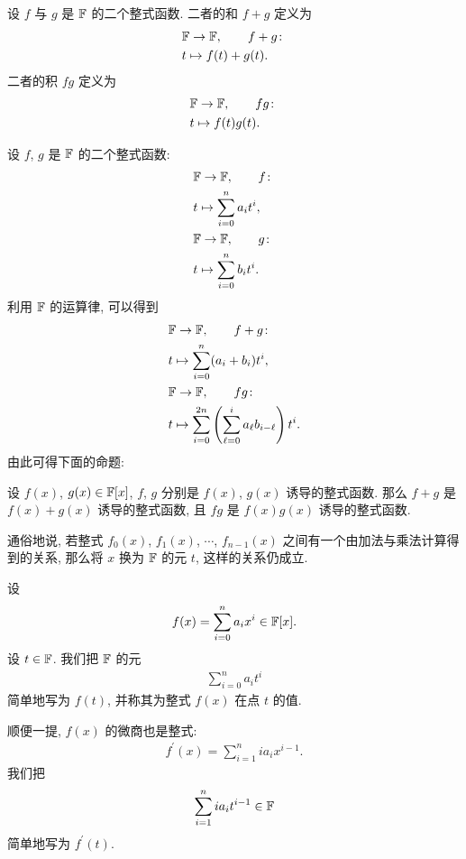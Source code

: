 \begin{definition}
    设 $f$ 与 $g$ 是 $\mathbb{F}$ 的二个整式函数. 二者的和 $f+g$ 定义为
    \begin{align*}
         & \mathbb{F} \to \mathbb{F}, \tag*{$f+g \colon$} \\
         & t \mapsto f(t) + g(t).
    \end{align*}
    二者的积 $fg$ 定义为
    \begin{align*}
         & \mathbb{F} \to \mathbb{F}, \tag*{$fg \colon$} \\
         & t \mapsto f(t) g(t).
    \end{align*}
\end{definition}

设 $f$, $g$ 是 $\mathbb{F}$ 的二个整式函数:
\begin{align*}
     & \mathbb{F} \to \mathbb{F}, \tag*{$f \colon$}  \\
     & t \mapsto \sum_{i=0}^n a_i t^i, \\
     & \mathbb{F} \to \mathbb{F}, \tag*{$g \colon$}  \\
     & t \mapsto \sum_{i=0}^n b_i t^i.
\end{align*}
利用 $\mathbb{F}$ 的运算律, 可以得到
\begin{align*}
     & \mathbb{F} \to \mathbb{F}, \tag*{$f+g \colon$}                                                  \\
     & t \mapsto \sum_{i=0}^n (a_i + b_i) t^i,                                           \\
     & \mathbb{F} \to \mathbb{F}, \tag*{$fg \colon$}                                                   \\
     & t \mapsto \sum_{i=0}^{2n} \left( \sum_{\ell=0}^{i} a_\ell b_{i-\ell} \right) t^i.
\end{align*}
由此可得下面的命题:

\begin{proposition}
    设 $f(x)$, $g(x) \in \mathbb{F}[x]$, $f$, $g$ 分别是 $f(x)$, $g(x)$ 诱导的整式函数. 那么 $f+g$ 是 $f(x)+g(x)$ 诱导的整式函数, 且 $fg$ 是 $f(x)g(x)$ 诱导的整式函数.

    通俗地说, 若整式 $f_0 (x)$, $f_1 (x)$, $\cdots$, $f_{n-1} (x)$ 之间有一个由加法与乘法计算得到的关系, 那么将 $x$ 换为 $\mathbb{F}$ 的元 $t$, 这样的关系仍成立.
\end{proposition}

\begin{definition}
    设
    \begin{align*}
        f(x) = \sum_{i=0}^n a_i x^i \in \mathbb{F}[x].
    \end{align*}
    设 $t \in \mathbb{F}$. 我们把 $\mathbb{F}$ 的元
    \begin{align*}
        \sum_{i=0}^n a_i t^i
    \end{align*}
    简单地写为 $f(t)$, 并称其为整式 $f(x)$ 在点 $t$ 的值.

    顺便一提, $f(x)$ 的微商也是整式:
    \begin{align*}
        f^{\prime} (x) = \sum_{i = 1}^{n} i a_i x^{i - 1}.
    \end{align*}
    我们把
    \begin{align*}
        \sum_{i = 1}^{n} i a_i t^{i - 1} \in \mathbb{F}
    \end{align*}
    简单地写为 $f^{\prime} (t)$.
\end{definition}

